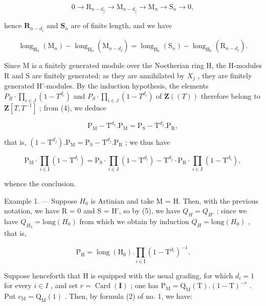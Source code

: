\[
0 \rightarrow \mathrm{R} _ {n - d _ {j}} \rightarrow \mathrm{M} _ {n - d _ {j}} \rightarrow \mathrm{M} _ {n} \rightarrow \mathrm{S} _ {n} \rightarrow 0,
\]

hence \(\mathbf{R}_{n - d_j}\) and \(\mathbf{S}_n\) are of finite length, and we have

\[
\operatorname{long} _ {\mathrm{H} _ {0}} \left(\mathrm{M} _ {n}\right) - \operatorname{long} _ {\mathrm{H} _ {0}} \left(\mathrm{M} _ {n - d _ {j}}\right) = \operatorname{long} _ {\mathrm{H} _ {0}} \left(\mathrm{S} _ {n}\right) - \operatorname{long} _ {\mathrm{H} _ {0}} \left(\mathrm{R} _ {n - d _ {j}}\right).\tag{4}
\]

Since M is a finitely generated module over the Noetherian ring H, the H-modules R and S are finitely generated; as they are annihilated by \(X_{j}\) , they are finitely generated H'-modules. By the induction hypothesis, the elements \(P_{R}\cdot\prod_{i\in J}(1-T^{d_{i}})\) and \(P_{S}\cdot\prod_{i\in J}(1-T^{d_{i}})\) of \(\mathbf{Z}((T))\) therefore belong to \(\mathbf{Z}[T,T^{-1}]\) ; from (4), we deduce

\[
\mathrm{P} _ {\mathrm{M}} - \mathrm{T} ^ {d _ {j}}. \mathrm{P} _ {\mathrm{M}} = \mathrm{P} _ {\mathrm{S}} - \mathrm{T} ^ {d _ {j}}. \mathrm{P} _ {\mathrm{R}},
\]

that is, \((1 - \mathrm{T}^{d_j}).\mathrm{P}_{\mathrm{M}} = \mathrm{P}_{\mathrm{S}} - \mathrm{T}^{d_j}.\mathrm{P}_{\mathrm{R}}\) ; we thus have

\[
\mathrm{P} _ {\mathrm{M}} \cdot \prod_ {i \in \mathrm{I}} (1 - \mathrm{T} ^ {d _ {i}}) = \mathrm{P} _ {\mathrm{S}} \cdot \prod_ {i \in \mathrm{J}} (1 - \mathrm{T} ^ {d _ {i}}) - \mathrm{T} ^ {d _ {j}} \cdot \mathrm{P} _ {\mathrm{R}} \cdot \prod_ {i \in \mathrm{J}} (1 - \mathrm{T} ^ {d _ {i}}),\tag{5}
\]

whence the conclusion.

Example 1. --- Suppose \(H_{0}\) is Artinian and take M = H. Then, with the previous notation, we have R = 0 and S = H', so by (5), we have \(Q_{H} = Q_{H'}\) ; since we have \(Q_{H_{0}} = \text{long}(H_{0})\) from which we obtain by induction \(Q_{H} = \text{long}(H_{0})\) , that is,

\[
\mathrm{P} _ {\mathrm{H}} = \operatorname{long} (\mathrm{H} _ {0}). \prod_ {i \in \mathrm{I}} (1 - \mathrm{T} ^ {d _ {i}}) ^ {- 1}.\tag{6}
\]

Suppose henceforth that H is equipped with the usual grading, for which \(d_{i}=1\) for every \(i\in I\) , and set \(r=\operatorname{Card}(\mathbf{I})\) ; one has \(\mathrm{P}_{\mathrm{M}}=\mathrm{Q}_{\mathrm{M}}(\mathrm{T}).(1-\mathrm{T})^{-r}\) . Put \(c_{\mathrm{M}}=\mathrm{Q}_{\mathrm{M}}(1)\) . Then, by formula (2) of no. 1, we have:

